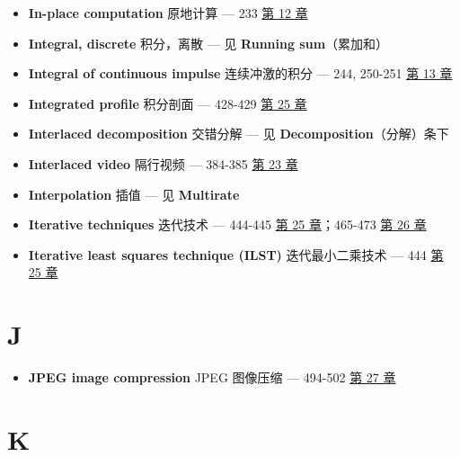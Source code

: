 \begin{itemize}
  \begin{itemize}
  \tightlist
  \item
    frequency domain encoded：频域编码 --- 56 
    \hyperref[ch-03]{第 3 章}；265-266, 268-270 
    \hyperref[ch-14]{第 14 章}
  \item
    spatial domain encoded：空间域编码 --- 373-374 
    \hyperref[ch-23]{第 23 章}；424-425  \hyperref[ch-25]{第
    25 章}
  \item
    time domain encoded：时域编码 --- 56-57 
    \hyperref[ch-03]{第 3 章}；265-267  \hyperref[ch-14]{第 14
    章}
  \end{itemize}
\item
  \textbf{In-place computation} 原地计算 --- 233 
  \hyperref[ch-12]{第 12 章}
\item
  \textbf{Integral, discrete} 积分，离散 --- 见 \textbf{Running
  sum}（累加和）
\item
  \textbf{Integral of continuous impulse} 连续冲激的积分 --- 244,
  250-251  \hyperref[ch-13]{第 13 章}
\item
  \textbf{Integrated profile} 积分剖面 --- 428-429 
  \hyperref[ch-25]{第 25 章}
\item
  \textbf{Interlaced decomposition} 交错分解 --- 见
  \textbf{Decomposition}（分解）条下
\item
  \textbf{Interlaced video} 隔行视频 --- 384-385 
  \hyperref[ch-23]{第 23 章}
\item
  \textbf{Interpolation} 插值 --- 见 \textbf{Multirate}
\item
  \textbf{Iterative techniques} 迭代技术 --- 444-445 
  \hyperref[ch-25]{第 25 章}；465-473  \hyperref[ch-26]{第 26
  章}
\item
  \textbf{Iterative least squares technique (ILST)} 迭代最小二乘技术 ---
  444  \hyperref[ch-25]{第 25 章}
\end{itemize}

\section{J}

\begin{itemize}
\tightlist
\item
  \textbf{JPEG image compression} JPEG 图像压缩 --- 494-502 
  \hyperref[ch-27]{第 27 章}
\end{itemize}

\section{K}

